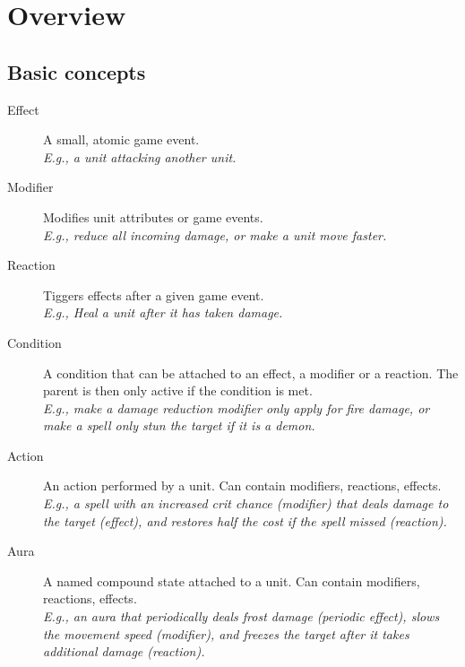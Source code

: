 \chapter{Overview}

\section{Basic concepts}

\begin{description}
	\item [Effect] A small, atomic game event.\\
		\textit{E.g., a unit attacking another unit.}
	\item [Modifier] Modifies unit attributes or game events.\\
		\textit{E.g., reduce all incoming damage, or make a unit move faster.}
	\item [Reaction] Tiggers effects after a given game event.\\
		\textit{E.g., Heal a unit after it has taken damage.}
	\item [Condition] A condition that can be attached to an effect, a modifier or a reaction. The parent is then only active if the condition is met.\\
		\textit{E.g., make a damage reduction modifier only apply for fire damage, or make a spell only stun the target if it is a demon.}
	\item [Action] An action performed by a unit. Can contain modifiers, reactions, effects.\\
		\textit{E.g., a spell with an increased crit chance (modifier) that deals damage to the target (effect), and restores half the cost if the spell missed (reaction).}
	\item [Aura] A named compound state attached to a unit. Can contain modifiers, reactions, effects.\\
		\textit{E.g., an aura that periodically deals frost damage (periodic effect), slows the movement speed (modifier), and freezes the target after it takes additional damage (reaction).}
\end{description}


